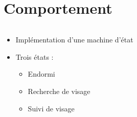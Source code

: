 \section{Comportement}
\begin{frame}
  \begin{columns}[c]
    \begin{column}{.5\textwidth}
      \begin{itemize}
        \item Implémentation d'une machine d'état
        \item Trois états :
          \begin{itemize}
            \item Endormi
            \item Recherche de visage
            \item Suivi de visage
          \end{itemize}
      \end{itemize}
    \end{column}
    \begin{column}{.5\textwidth}
      \begin{figure}
        
      \end{figure}
    \end{column}
 \end{columns}
\end{frame}

